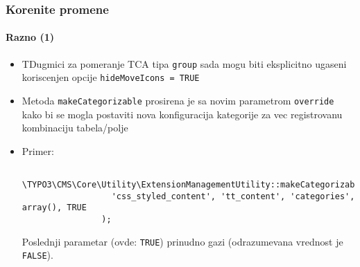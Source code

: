 \begin{frame}[fragile]
	\frametitle{Korenite promene}
	\framesubtitle{Razno (1)}

	\begin{itemize}

		\item TDugmici za pomeranje TCA tipa \texttt{group} sada mogu biti eksplicitno ugaseni 
				koriscenjen opcije \texttt{hideMoveIcons = TRUE}

		\item Metoda \texttt{makeCategorizable} prosirena je sa novim parametrom 
			\texttt{override} kako bi se mogla postaviti nova konfiguracija kategorije za vec registrovanu kombinaciju 
			tabela/polje

		\item Primer:

			\begin{lstlisting}
				\TYPO3\CMS\Core\Utility\ExtensionManagementUtility::makeCategorizable(
				  'css_styled_content', 'tt_content', 'categories', array(), TRUE
				);
			\end{lstlisting}

			\small
				Poslednji parametar (ovde: \texttt{TRUE}) prinudno gazi (odrazumevana vrednost je \texttt{FALSE}).
			\normalsize

	\end{itemize}

\end{frame}


